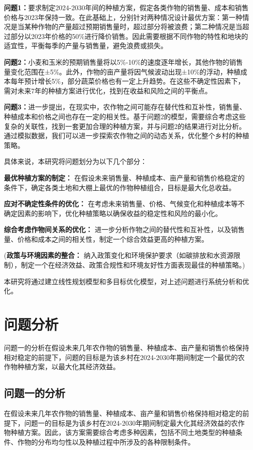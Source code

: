 \documentclass{cumcmthesis}
\begin{document}
\textbf{问题1：}要求制定2024-2030年间的种植方案，假定各类作物的销售量、成本和销售价格与2023年保持一致。在此基础上，分别针对两种情况设计最优方案：第一种情况是当某种作物的产量超过预期销售量时，超过部分将被浪费；第二种情况是当超过部分以2023年价格的50\%进行降价销售。因此需要根据不同作物的特性和地块的适宜性，平衡每季的产量与销售量，避免浪费或损失。

\textbf{问题2：}小麦和玉米的预期销售量将以5\%-10\%的速度逐年增长，其他作物的销售量变化范围在±5\%。此外，作物的亩产量将因气候波动出现±10\%的浮动，种植成本每年预计增长5\%，部分蔬菜价格也有一定上升趋势。在这些不确定性因素下，需对未来7年的种植方案进行优化，找到在收益和风险之间的平衡点。

\textbf{问题3：}进一步提出，在现实中，农作物之间可能存在替代性和互补性，销售量、种植成本和价格之间也存在一定的相关性。基于问题2的模型，需要综合考虑这些复杂的关联性，找到一套更加合理的种植方案，并与问题2的结果进行对比分析。通过模拟数据，我们可以进一步探索农作物之间的动态关系，优化整个乡村的种植策略。

具体来说，本研究将问题划分为以下几个部分：

\textbf{最优种植方案的制定：} 在假设未来销售量、种植成本、亩产量和销售价格稳定的条件下，确定各类土地和大棚上最优的作物种植组合，目标是最大化总收益。

\textbf{应对不确定性条件的优化：} 在考虑未来销售量、价格、气候变化和种植成本等不确定因素的影响下，优化种植策略以确保收益的稳定性和风险的最小化。

\textbf{综合考虑作物间关系的优化：} 进一步分析作物之间的替代性和互补性，以及销售量、价格和成本之间的相关性，制定一个综合效益更高的种植方案。

(\textbf{政策与环境因素的整合：} 纳入政策变化和环境保护要求（如碳排放和水资源限制），制定一个在经济效益、政策合规性和环境友好性方面表现最佳的种植策略。)

本研究将通过建立线性规划模型和多目标优化模型，对上述问题进行系统分析和优化。


\section{问题分析}
问题一的分析在假设未来几年农作物的销售量、种植成本、亩产量和销售价格保持相对稳定的前提下，问题的目标是为该乡村在2024-2030年期间制定一个最优的农作物种植方案，以最大化其经济效益。
\subsection{问题一的分析}
在假设未来几年农作物的销售量、种植成本、亩产量和销售价格保持相对稳定的前提下，问题一的目标是为该乡村在2024-2030年期间制定最大化其经济效益的农作物种植方案。因此，该方案需要综合考虑多种因素，包括不同土地类型的种植条件、作物的分布均匀性以及种植过程中所涉及的各种限制条件。
\end{document}
